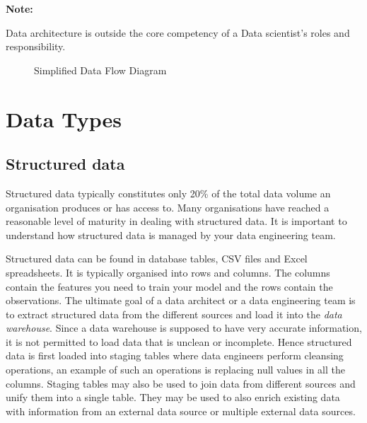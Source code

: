 \documentclass[a4paper, 11pt]{book}
\newenvironment{note}{
    \begin{siderule}
        \textbf{Note: }
        }{
    \end{siderule}}
\begin{document}
    \begin{note}
        Data architecture is outside the core competency of a Data scientist’s roles and responsibility.
    \end{note}

    \begin{figure}[ht]
        \centering
        \caption{Simplified Data Flow Diagram}
        \label{fig:dataflow}
    \end{figure}


    \section{Data Types}

    \subsection{Structured data}

    Structured data typically constitutes only 20\% of the total data volume an organisation produces or has access to.
    Many organisations have reached a reasonable level of maturity in dealing with structured data.
    It is important to understand how structured data is managed by your data engineering team.

    Structured data can be found in database tables, CSV files and Excel spreadsheets.
    It is typically organised into rows and columns.
    The columns contain the features you need to train your model and the rows contain the observations.
    The ultimate goal of a data architect or a data engineering team is to extract structured data from the different sources and load it into the \textit{data warehouse}.
    Since a data warehouse is supposed to have very accurate information, it is not permitted to load data that is unclean or incomplete.
    Hence structured data is first loaded into staging tables where data engineers perform cleansing operations, an example of such an operations is replacing null values in all the columns.
    Staging tables may also be used to join data from different sources and unify them into a single table.
    They may be used to also enrich existing data with information from an external data source or multiple external data sources.
\end{document}
